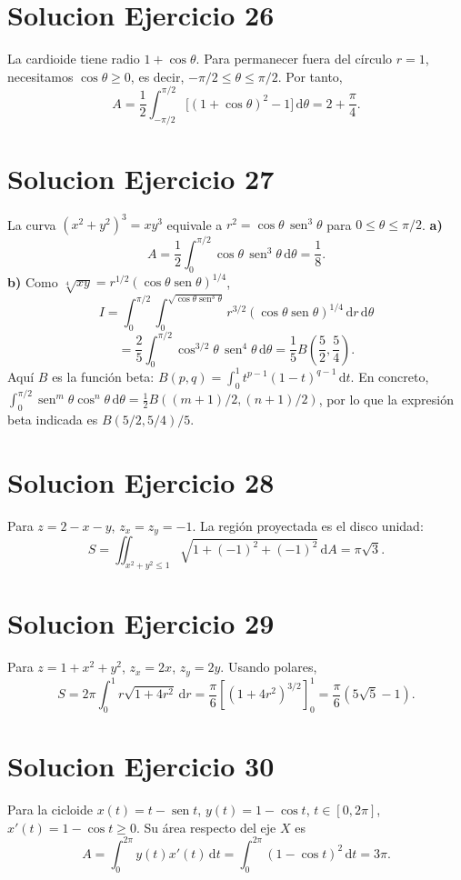 \documentclass[11pt,a4paper]{article}
\DeclareMathOperator{\sen}{sen}
\newcommand{\dd}{\,\mathrm{d}}
\begin{document}
\section{Solucion Ejercicio 26}
La cardioide tiene radio $1+\cos\theta$. Para permanecer fuera del círculo $r=1$, necesitamos $\cos\theta\ge0$, es decir, $-\pi/2\le\theta\le\pi/2$. Por tanto,
\[A=\frac12\int_{-\pi/2}^{\pi/2}\bigl[(1+\cos\theta)^2-1\bigr]\dd\theta=\boxed{2+\frac\pi4}.\]

\section{Solucion Ejercicio 27}
La curva $(x^2+y^2)^3=xy^3$ equivale a $r^2=\cos\theta\,\sen^3\theta$ para $0\le\theta\le\pi/2$.
\textbf{a)}
\[A=\frac12\int_0^{\pi/2}\cos\theta\,\sen^3\theta\dd\theta=\boxed{\frac18}.\]
\textbf{b)} Como $\sqrt[4]{xy}=r^{1/2}(\cos\theta\sen\theta)^{1/4}$,
\[I=\int_0^{\pi/2}\int_0^{\sqrt{\cos\theta\sen^3\theta}}r^{3/2}(\cos\theta\sen\theta)^{1/4}\dd r\dd\theta\]
\[=\frac25\int_0^{\pi/2}\cos^{3/2}\theta\,\sen^4\theta\dd\theta=\boxed{\frac15 B\left(\frac52,\frac54\right)}.\]
Aquí $B$ es la función beta: $B(p,q)=\int_0^1t^{p-1}(1-t)^{q-1}\dd t$. En concreto, $\int_0^{\pi/2}\sen^m\theta\cos^n\theta\dd\theta=\tfrac12B((m+1)/2,(n+1)/2)$, por lo que la expresión beta indicada es $B(5/2,5/4)/5$.

\section{Solucion Ejercicio 28}
Para $z=2-x-y$, $z_x=z_y=-1$. La región proyectada es el disco unidad:
\[S=\iint_{x^2+y^2\le1}\sqrt{1+(-1)^2+(-1)^2}\dd A=\boxed{\pi\sqrt3}.\]

\section{Solucion Ejercicio 29}
Para $z=1+x^2+y^2$, $z_x=2x$, $z_y=2y$. Usando polares,
\[S=2\pi\int_0^1r\sqrt{1+4r^2}\dd r=\frac\pi6[(1+4r^2)^{3/2}]_0^1=\boxed{\frac\pi6(5\sqrt5-1)}.\]

\section{Solucion Ejercicio 30}
Para la cicloide $x(t)=t-\sen t$, $y(t)=1-\cos t$, $t\in[0,2\pi]$, $x'(t)=1-\cos t\ge0$. Su área respecto del eje $X$ es
\[A=\int_0^{2\pi}y(t)x'(t)\dd t=\int_0^{2\pi}(1-\cos t)^2\dd t=\boxed{3\pi}.\]
\end{document}

